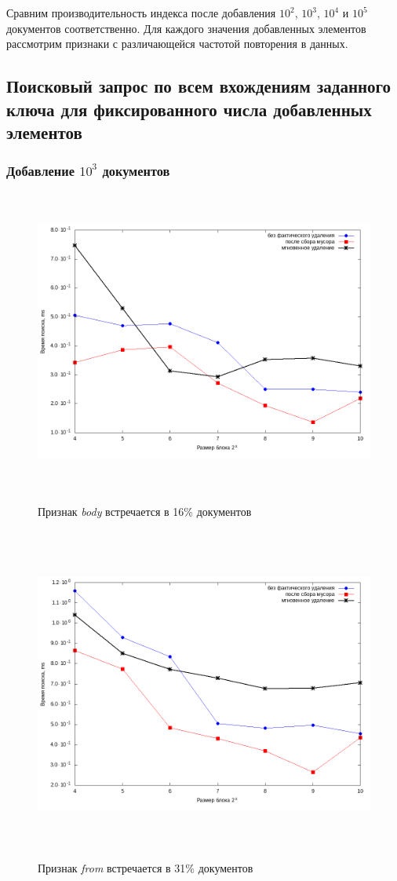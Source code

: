 Сравним производительность индекса после добавления $10^2$, $10^3$, $10^4$ и $10^5$
документов соответственно. Для каждого значения добавленных элементов рассмотрим
признаки с различающейся частотой повторения в данных.

\subsection{Поисковый запрос по всем вхождениям заданного ключа для фиксированного числа добавленных элементов}

\subsubsection{Добавление $10^3$ документов}

\begin{figure}[H]
\includegraphics[width=\linewidth, height=10cm]{fig/limit_1e6/1e3/body.png}
\caption{Признак \textit{body} встречается в 16\% документов}
\includegraphics[width=\linewidth, height=11cm]{fig/limit_1e6/1e3/from.png}
\caption{Признак \textit{from} встречается в 31\% документов}
\end{figure}

